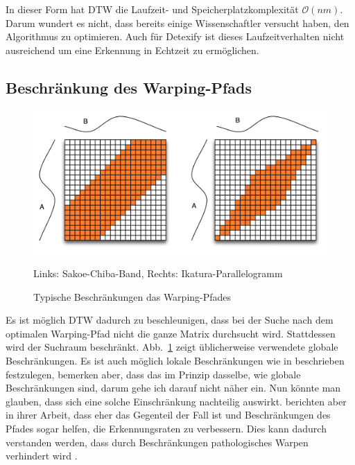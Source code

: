
In dieser Form hat DTW die Laufzeit- und Speicherplatzkomplexität \(\mathcal{O}(nm)\). Darum wundert es nicht, dass bereits einige Wissenschaftler versucht haben, den Algorithmus zu optimieren. Auch für Detexify ist dieses Laufzeitverhalten nicht ausreichend um eine Erkennung in Echtzeit zu ermöglichen.


\subsection{Beschränkung des Warping-Pfads} %
\label{sub:constrained_warping_window}

\begin{figure}
  \centering \includegraphics[width=\textwidth]{figures/constraints.png}
  \caption{Typische Beschränkungen das Warping-Pfades}
   Links: Sakoe-Chiba-Band, Rechts: Ikatura-Parallelogramm
  \label{fig:constraints}
\end{figure}


Es ist möglich DTW dadurch zu beschleunigen, dass bei der Suche nach dem optimalen Warping-Pfad nicht die ganze Matrix durchsucht wird. Stattdessen wird der Suchraum beschränkt. Abb.~\ref{fig:constraints} zeigt üblicherweise verwendete globale Beschränkungen. Es ist auch möglich lokale Beschränkungen wie in \cite{Rabiner:1993p11752} beschrieben festzulegen, \citet{Keogh:2005p7751} bemerken aber, dass das im Prinzip dasselbe, wie globale Beschränkungen sind, darum gehe ich darauf nicht näher ein. Nun könnte man glauben, dass sich eine solche Einschränkung nachteilig auswirkt. \citet{Ratanamahatana:2004p7522} berichten aber in ihrer Arbeit, dass eher das Gegenteil der Fall ist und Beschränkungen des Pfades sogar helfen, die Erkennungsraten zu verbessern. Dies kann dadurch verstanden werden, dass durch Beschränkungen pathologisches Warpen verhindert wird \cite{Keogh:2005p7751}.

